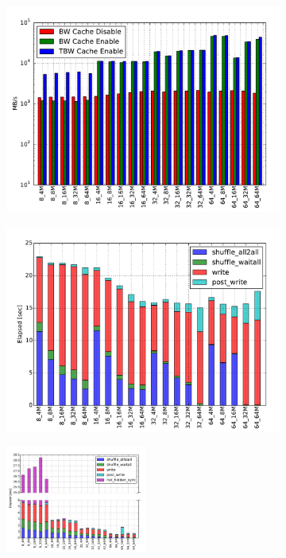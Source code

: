 \begin{figure}[!htb]
  \begin{subfigure}[t]{0.51\textwidth}
  \centering
  \includegraphics[width=\textwidth]{chapters/chapter3/figures/flash_32GB_30sec_bw}
  \caption{}
  \label{figure: flash-bw}
  \end{subfigure}
  \begin{subfigure}[t]{0.51\textwidth}
  \centering
  \includegraphics[width=\textwidth]{chapters/chapter3/figures/flash_32GB_30sec_elapsed_disable}
  \caption{}
  \label{figure: flash-elaps-disable}
  \end{subfigure}
  \begin{subfigure}[b]{\textwidth}
  \centering
  \includegraphics[width=0.51\textwidth]{chapters/chapter3/figures/flash_32GB_30sec_elapsed_enable}

\end{subfigure}
\end{figure}
